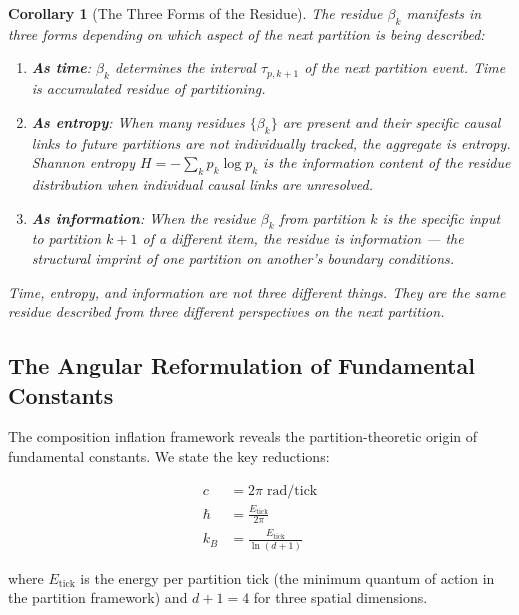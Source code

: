 \documentclass[11pt,twocolumn,a4paper]{article}
\theoremstyle{plain}
\newtheorem{corollary}[theorem]{Corollary}
\theoremstyle{definition}
\theoremstyle{remark}
\begin{document}
\begin{corollary}[The Three Forms of the Residue]
\label{cor:three_forms}
The residue $\beta_k$ manifests in three forms depending on which aspect of
the next partition is being described:
\begin{enumerate}
    \item \textbf{As time}: $\beta_k$ determines the interval $\tau_{p,k+1}$
          of the next partition event. Time is accumulated residue of partitioning.

    \item \textbf{As entropy}: When many residues $\{\beta_k\}$ are present and
          their specific causal links to future partitions are not individually
          tracked, the aggregate is entropy. Shannon entropy
          $H = -\sum_k p_k \log p_k$ is the information content of the
          residue distribution when individual causal links are unresolved.

    \item \textbf{As information}: When the residue $\beta_k$ from partition $k$
          is the specific input to partition $k+1$ of a different item, the
          residue is \emph{information} --- the structural imprint of one
          partition on another's boundary conditions.
\end{enumerate}
Time, entropy, and information are not three different things. They are the
same residue described from three different perspectives on the next partition.
\end{corollary}

\subsection{The Angular Reformulation of Fundamental Constants}
\label{subsec:angular}

The composition inflation framework reveals the partition-theoretic origin of
fundamental constants. We state the key reductions:

\begin{align}
    c &= 2\pi \;\mathrm{rad/tick}
    \label{eq:c_angular} \\
    \hbar &= \frac{E_{\mathrm{tick}}}{2\pi}
    \label{eq:hbar_angular} \\
    k_B &= \frac{E_{\mathrm{tick}}}{\ln(d+1)}
    \label{eq:kb_angular}
\end{align}

where $E_{\mathrm{tick}}$ is the energy per partition tick (the minimum quantum
of action in the partition framework) and $d+1 = 4$ for three spatial dimensions.
\end{document}

